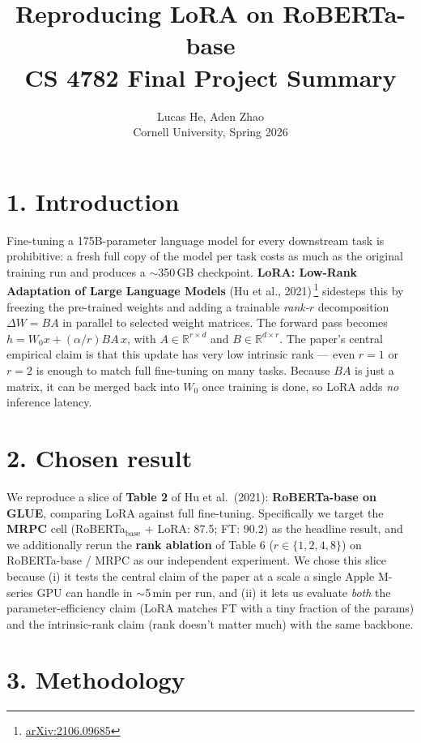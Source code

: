 \documentclass[11pt]{article}
\title{\vspace{-2em}\textbf{Reproducing LoRA on RoBERTa-base}\\
       \large CS 4782 Final Project Summary}
\author{Lucas He, Aden Zhao \\
        \small Cornell University, Spring 2026}
\date{\vspace{-1em}}
\begin{document}
\maketitle
\vspace{-1.5em}

\section*{1. Introduction}

Fine-tuning a 175B-parameter language model for every downstream task is
prohibitive: a fresh full copy of the model per task costs as much as the
original training run and produces a $\sim$350\,GB checkpoint. \textbf{LoRA:
Low-Rank Adaptation of Large Language Models} (Hu et al., 2021)\,\footnote{\href{https://arxiv.org/abs/2106.09685}{arXiv:2106.09685}}
sidesteps this by freezing the pre-trained weights and adding a trainable
\emph{rank-$r$} decomposition $\Delta W = BA$ in parallel to selected weight
matrices. The forward pass becomes $h = W_0 x + (\alpha/r) BA\, x$, with $A
\in \mathbb{R}^{r \times d}$ and $B \in \mathbb{R}^{d \times r}$. The paper's
central empirical claim is that this update has very low intrinsic rank ---
even $r{=}1$ or $r{=}2$ is enough to match full fine-tuning on many tasks.
Because $BA$ is just a matrix, it can be merged back into $W_0$ once
training is done, so LoRA adds \emph{no} inference latency.

\section*{2. Chosen result}

We reproduce a slice of \textbf{Table 2} of Hu et al.\ (2021): \textbf{RoBERTa-base
on GLUE}, comparing LoRA against full fine-tuning. Specifically we target
the \textbf{MRPC} cell (RoBERTa$_\text{base}$ + LoRA: 87.5; FT: 90.2) as
the headline result, and we additionally rerun the \textbf{rank ablation}
of Table 6 ($r \in \{1,2,4,8\}$) on RoBERTa-base / MRPC as our independent
experiment. We chose this slice because (i) it tests the central claim of
the paper at a scale a single Apple M-series GPU can handle in $\sim$5\,min
per run, and (ii) it lets us evaluate \emph{both} the parameter-efficiency
claim (LoRA matches FT with a tiny fraction of the params) and the
intrinsic-rank claim (rank doesn't matter much) with the same backbone.

\section*{3. Methodology}
\end{document}
